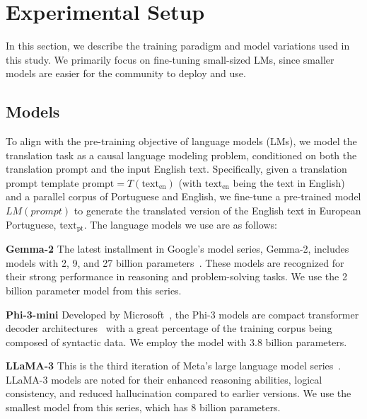 \section{Experimental Setup}
\label{sec:exp_setup}
In this section, we describe the training paradigm and model variations used in this study.  
We primarily focus on fine-tuning small-sized LMs, since smaller models are easier for the community to deploy and use. 

\subsection{Models}

To align with the pre-training objective of language models (LMs), we model the translation task as a causal language modeling problem, conditioned on both the translation prompt and the input English text. Specifically, given a translation prompt template \textit{\( \text{prompt} = T(\text{text}_\text{en}) \)} (with \textit{\( \text{text}_\text{en} \)} being the text in English) and a parallel corpus of Portuguese and English, we fine-tune a pre-trained model \textit{\( LM(\textit{prompt}) \)} to generate the translated version of the English text in European Portuguese, \textit{\( \text{text}_\text{pt} \)}. The language models we use are as follows:

\begin{description}
    \item \textbf{Gemma-2} The latest installment in Google's model series, Gemma-2, includes models with 2, 9, and 27 billion parameters~\cite{team2024gemma2}. These models are recognized for their strong performance in reasoning and problem-solving tasks. We use the 2 billion parameter model from this series.
    
    \item \textbf{Phi-3-mini} Developed by Microsoft~\cite{Abdin2024}, the Phi-3 models are compact transformer decoder architectures~\cite{Vaswani2017} with a great percentage of the training corpus being composed of syntactic data. We employ the model with 3.8 billion parameters.
    
    \item \textbf{LLaMA-3} This is the third iteration of Meta's large language model series~\cite{AI2024}. LLaMA-3 models are noted for their enhanced reasoning abilities, logical consistency, and reduced hallucination compared to earlier versions. We use the smallest model from this series, which has 8 billion parameters.
\end{description}

